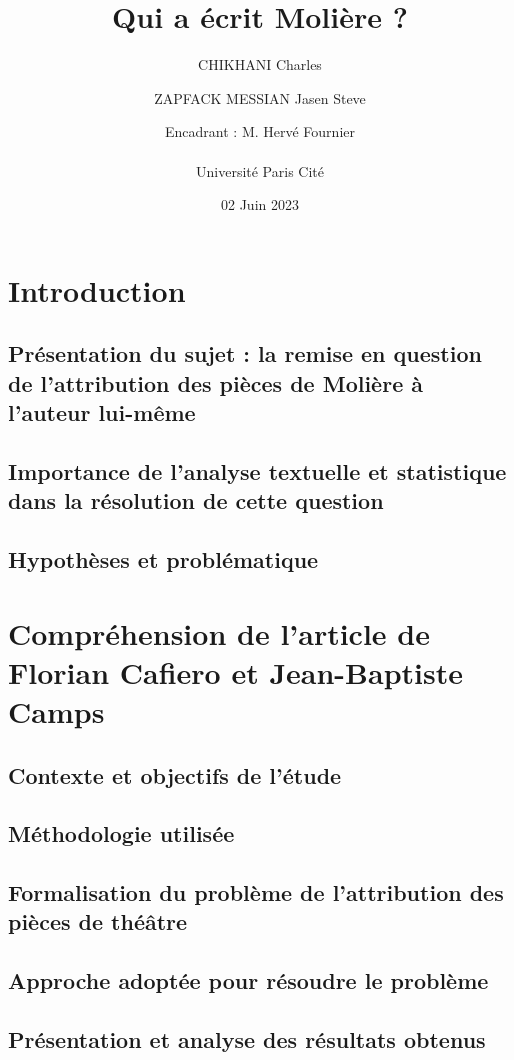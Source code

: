 \documentclass{report} %
\title{Qui a écrit Molière ?}
\author{CHIKHANI Charles \and ZAPFACK MESSIAN Jasen Steve \\ \and Encadrant : M. Hervé Fournier\\ \\ Université Paris Cité}
\date{02 Juin 2023}
\begin{document}
\maketitle
\tableofcontents

\newpage

\section{Introduction}

\vspace{\baselineskip}
\subsection{Présentation du sujet : la remise en question de l'attribution des pièces de Molière à l'auteur lui-même}

\subsection{Importance de l'analyse textuelle et statistique dans la résolution de cette question}

\subsection{Hypothèses et problématique}


\section{Compréhension de l'article de Florian Cafiero et Jean-Baptiste Camps}

\subsection{Contexte et objectifs de l'étude}
\subsection{Méthodologie utilisée}
\subsection{Formalisation du problème de l'attribution des pièces de théâtre}
\subsection{Approche adoptée pour résoudre le problème}
\subsection{Présentation et analyse des résultats obtenus}
\end{document}
